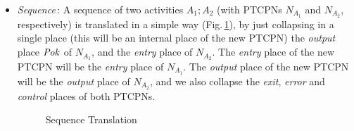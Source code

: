 \begin{itemize}

\item {\it Sequence}\,: A sequence of two activities $A_1;A_2$ (with PTCPNs $N_{A_1}$ and
      $N_{A_2}$, respectively)
      is translated in a simple
      way (Fig.\,\ref{seq}), by just collapsing in a 
      single place (this will be
      an internal place of the new PTCPN)
      the {\it output} place ${\it Pok}$ of $N_{A_1}$, and the
      {\it entry} place of $N_{A_2}$.  The {\it entry} place
      of the new PTCPN will
      be the {\it entry} place of $N_{A_1}$. The
      {\it output} place of the new PTCPN will
      be the {\it output} place of  $N_{A_2}$, and we also
      collapse the {\it exit}, {\it error} and {\it control}  places of both PTCPNs.


\begin{figure}[!ht]
\vspace{-0.5cm}
\begin{center}
\end{center}
\vspace{-0.65cm}
\caption{\label{seq} Sequence Translation}
\vspace{-0.6cm}
\end{figure}


\end{itemize}
